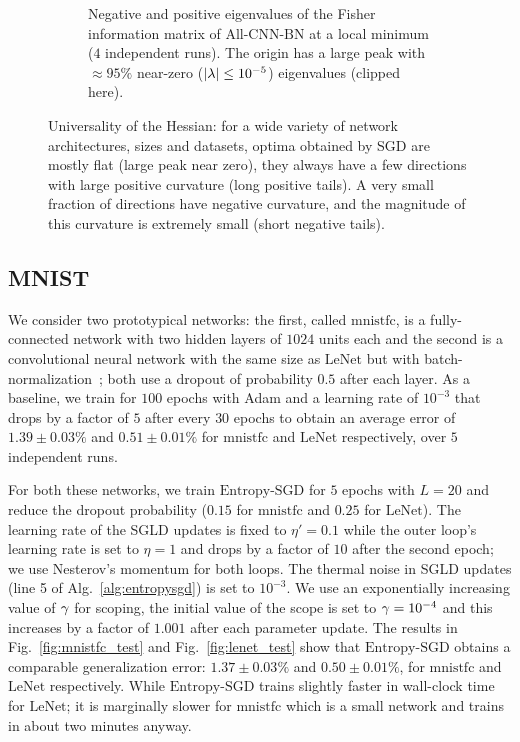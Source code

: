 \documentclass[10pt]{article}
\newcommand{\entropysgd}{\mathrm{Entropy}\textrm{-}\mathrm{SGD}}
\newcommand{\mnistfc}{\textrm{mnistfc}}
\newcommand{\lenet}{\textrm{LeNet}}
\newcommand{\allcnn}{\textrm{All-CNN-BN}}
\begin{document}
\begin{figure}[!tbh]
\begin{subfigure}[b]{\textwidth}
\begin{subfigure}[b]{0.44 \textwidth}
        \end{subfigure}
    \caption{\small Negative and positive eigenvalues of the Fisher information matrix of $\allcnn$ at a local minimum ($4$ independent runs). The origin has a large peak with $\approx 95\%$ near-zero ($\left| \lambda \right| \leq 10^{-5}$) eigenvalues (clipped here).}
    \label{fig:allcnn_hessian}
    \end{subfigure}
\caption{\small Universality of the Hessian: for a wide variety of network architectures, sizes and datasets, optima obtained by SGD are mostly flat (large peak near zero), they always have a few directions with large positive curvature (long positive tails). A very small fraction of directions have negative curvature, and the magnitude of this curvature is extremely small (short negative tails).}
\label{fig:universality}
\end{figure}

\subsection{MNIST}
\label{ss:expt:mnist}

We consider two prototypical networks: the first, called $\mnistfc$, is a fully-connected network with two hidden layers of $1024$ units each and the second is a convolutional neural network with the same size as $\lenet$ but with batch-normalization~\citep{ioffe2015batch}; both use a dropout of probability $0.5$ after each layer. As a baseline, we train for $100$ epochs with Adam and a learning rate of $10^{-3}$ that drops by a factor of $5$ after every $30$ epochs to obtain an average error of $1.39 \pm 0.03\%$ and $0.51 \pm 0.01 \%$ for $\mnistfc$ and $\lenet$ respectively, over $5$ independent runs.

For both these networks, we train $\entropysgd$ for $5$ epochs with $L = 20$ and reduce the dropout probability ($0.15$ for $\mnistfc$ and $0.25$ for $\lenet$). The learning rate of the SGLD updates is fixed to $\eta' = 0.1$ while the outer loop's learning rate is set to $\eta=1$ and drops by a factor of $10$ after the second epoch; we use Nesterov's momentum for both loops. The thermal noise in SGLD updates (line 5 of Alg.~\ref{alg:entropysgd}) is set to $10^{-3}$. We use an exponentially increasing value of $\gamma$ for scoping, the initial value of the scope is set to $\gamma = 10^{-4}$ and this increases by a factor of $1.001$ after each parameter update. The results in Fig.~\ref{fig:mnistfc_test} and Fig.~\ref{fig:lenet_test} show that $\entropysgd$ obtains a comparable generalization error: $1.37 \pm 0.03 \%$ and $0.50 \pm 0.01 \%$, for $\mnistfc$ and $\lenet$ respectively. While $\entropysgd$ trains slightly faster in wall-clock time for $\lenet$; it is marginally slower for $\mnistfc$ which is a small network and trains in about two minutes anyway.
\end{document}
